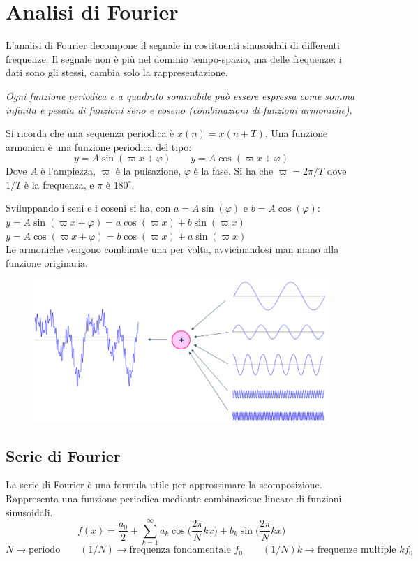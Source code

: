 \section{Analisi di Fourier}
L'analisi di Fourier decompone il segnale in costituenti sinusoidali di differenti frequenze. Il segnale non è più nel dominio tempo-spazio, ma delle frequenze: i dati sono gli stessi, cambia solo la rappresentazione.

\textit{Ogni funzione periodica e a quadrato sommabile può essere espressa come somma infinita e pesata di funzioni seno e coseno (combinazioni di funzioni armoniche).}

Si ricorda che una sequenza periodica è $x(n) = x(n + T)$. Una funzione armonica è una funzione periodica del tipo:
$$y = A\sin(\varpi x + \varphi) \qquad y = A\cos(\varpi x + \varphi)$$
Dove $A$ è l'ampiezza, $\varpi$ è la pulsazione, $\varphi$ è la fase. Si ha che $\varpi = 2\pi/T$ dove $1/T$ è la frequenza, e $\pi$ è $180^{\circ}$.

Sviluppando i seni e i coseni si ha, con $a = A\sin(\varphi)$ e $b = A\cos(\varphi)$: \\
$y = A\sin(\varpi x + \varphi) = a\cos (\varpi x) + b\sin(\varpi x)$ \\
$y = A\cos(\varpi x + \varphi) = b\cos(\varpi x) + a\sin(\varpi x)$ \\

Le armoniche vengono combinate una per volta, avvicinandosi man mano alla funzione originaria.
\begin{figure}[h]
	\centering
	\includegraphics[scale=0.43]{Lezioni/Immagini/fourier}
\end{figure}

\subsection{Serie di Fourier}
La serie di Fourier è una formula utile per approssimare la scomposizione. Rappresenta una funzione periodica mediante combinazione lineare di funzioni sinusoidali.
$$f(x) = \frac{a_0}{2} + \sum_{k=1}^{\infty} a_k \cos\Big(\frac{2\pi}{N}kx\Big) + b_k\sin\Big(\frac{2\pi}{N}kx\Big)$$
$$N \rightarrow \text{periodo} \qquad (1/N) \rightarrow \text{frequenza fondamentale } f_0 \qquad (1/N)k \rightarrow \text{frequenze multiple } kf_0$$

